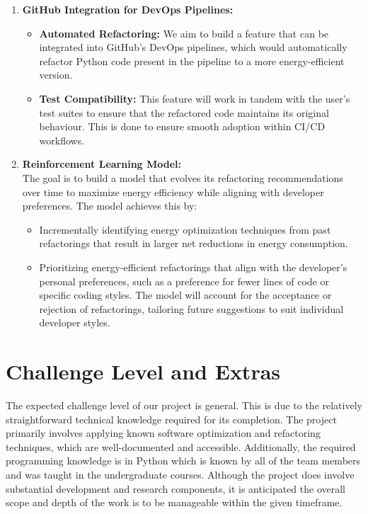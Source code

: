 \documentclass{article}
\begin{document}
\begin{enumerate}
  \item \textbf{GitHub Integration for DevOps Pipelines:}
    \begin{itemize}
      \item \textbf{Automated Refactoring:} We aim to build a feature
        that can be integrated into GitHub’s DevOps pipelines, which
        would automatically refactor Python code present in the
        pipeline to a more energy-efficient version.
      \item \textbf{Test Compatibility:} This feature will work in
        tandem with the user's test suites to ensure that the
        refactored code maintains its original behaviour. This is
        done to ensure smooth adoption within CI/CD workflows.
    \end{itemize}

  \item \textbf{Reinforcement Learning Model:} \\
    The goal is to build a model that evolves its refactoring
    recommendations over time to maximize energy efficiency while
    aligning with developer preferences. The model achieves this by:
    \begin{itemize}
      \item Incrementally identifying energy optimization techniques
        from past refactorings that result in larger net reductions
        in energy consumption.
      \item Prioritizing energy-efficient refactorings that align
        with the developer's personal preferences, such as a
        preference for fewer lines of code or specific coding styles.
        The model will account for the acceptance or rejection of
        refactorings, tailoring future suggestions to suit individual
        developer styles.
    \end{itemize}
\end{enumerate}

\section{Challenge Level and Extras}

The expected challenge level of our project is general. This is due to the
relatively straightforward technical knowledge required for its completion.
The project primarily involves applying known software optimization and
refactoring techniques, which are well-documented and accessible.
Additionally, the required programming knowledge is in Python which is known
by all of the team members and was taught in the undergraduate courses.
Although the project does involve substantial development and
research components,
it is anticipated the overall scope and depth of the work is to be
manageable within the
given timeframe. \\
\end{document}
